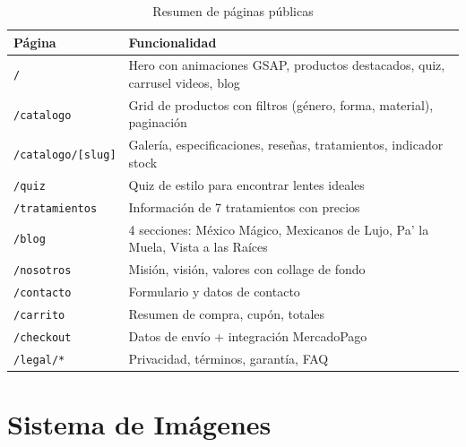 \documentclass[12pt, a4paper]{article}
\begin{document}
\begin{table}[H]
\centering
\small
\begin{tabularx}{\textwidth}{lX}
\toprule
\textbf{P\'{a}gina} & \textbf{Funcionalidad} \\
\midrule
\texttt{/} & Hero con animaciones GSAP, productos destacados, quiz, carrusel videos, blog \\
\texttt{/catalogo} & Grid de productos con filtros (g\'{e}nero, forma, material), paginaci\'{o}n \\
\texttt{/catalogo/[slug]} & Galer\'{i}a, especificaciones, rese\~{n}as, tratamientos, indicador stock \\
\texttt{/quiz} & Quiz de estilo para encontrar lentes ideales \\
\texttt{/tratamientos} & Informaci\'{o}n de 7 tratamientos con precios \\
\texttt{/blog} & 4 secciones: M\'{e}xico M\'{a}gico, Mexicanos de Lujo, Pa' la Muela, Vista a las Ra\'{i}ces \\
\texttt{/nosotros} & Misi\'{o}n, visi\'{o}n, valores con collage de fondo \\
\texttt{/contacto} & Formulario y datos de contacto \\
\texttt{/carrito} & Resumen de compra, cup\'{o}n, totales \\
\texttt{/checkout} & Datos de env\'{i}o + integraci\'{o}n MercadoPago \\
\texttt{/legal/*} & Privacidad, t\'{e}rminos, garant\'{i}a, FAQ \\
\bottomrule
\end{tabularx}
\caption{Resumen de p\'{a}ginas p\'{u}blicas}
\end{table}

\section{Sistema de Im\'{a}genes}
\end{document}
